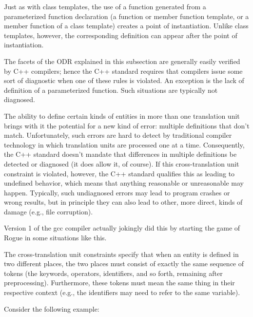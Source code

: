 Just as with class templates, the use of a function generated from a parameterized function declaration (a function or member function template, or a member function of a class template) creates a point of instantiation. Unlike class templates, however, the corresponding definition can appear after the point of instantiation.

The facets of the ODR explained in this subsection are generally easily verified by C++ compilers; hence the C++ standard requires that compilers issue some sort of diagnostic when one of these rules is violated. An exception is the lack of definition of a parameterized function. Such situations are typically not diagnosed.


The ability to define certain kinds of entities in more than one translation unit brings with it the potential for a new kind of error: multiple definitions that don’t match. Unfortunately, such errors are hard to detect by traditional compiler technology in which translation units are processed one at a time. Consequently, the C++ standard doesn’t mandate that differences in multiple definitions be detected or diagnosed (it does allow it, of course). If this cross-translation unit constraint is violated, however, the C++ standard qualifies this as leading to undefined behavior, which means that anything reasonable or unreasonable may happen. Typically, such undiagnosed errors may lead to program crashes or wrong results, but in principle they can also lead to other, more direct, kinds of damage (e.g., file corruption).

\begin{tcolorbox}[colback=webgreen!5!white,colframe=webgreen!75!black]
\hspace*{0.75cm}Version 1 of the gcc compiler actually jokingly did this by starting the game of Rogue in some situations like this.
\end{tcolorbox}

The cross-translation unit constraints specify that when an entity is defined in two different places, the two places must consist of exactly the same sequence of tokens (the keywords, operators, identifiers, and so forth, remaining after preprocessing). Furthermore, these tokens must mean the same thing in their respective context (e.g., the identifiers may need to refer to the same variable). 

Consider the following example:

